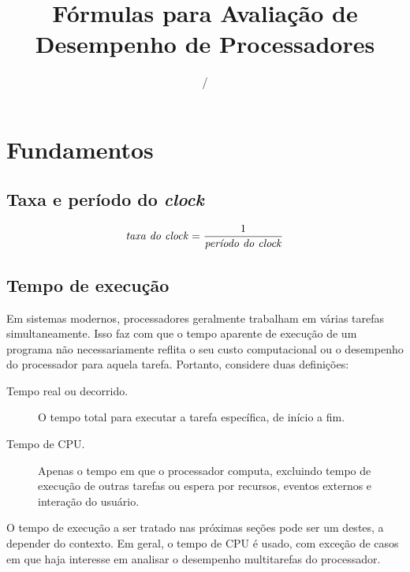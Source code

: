 \documentclass[12pt]{article}
\title{Fórmulas para Avaliação de Desempenho de Processadores}
\author{}
\date{\the\month/\the\year}
\newcommand{\Text}[1]{\textrm{\textit{#1}}}
\begin{document}
\maketitle

\tableofcontents

\vspace*{\fill}

\doclicenseThis

\newpage


\section{Fundamentos}


\subsection{Taxa e período do \textit{clock}}

\[ \Text{taxa do clock} = \frac{1}{\Text{período do clock}} \]


\subsection{Tempo de execução}

Em sistemas modernos, processadores geralmente trabalham em várias tarefas simultaneamente. Isso faz com que o tempo aparente de execução de um programa não necessariamente reflita o seu custo computacional ou o desempenho do processador para aquela tarefa. Portanto, considere duas definições:

\begin{description}
  \item[Tempo real ou decorrido.] O tempo total para executar a tarefa específica, de início a fim.
  \item[Tempo de CPU.] Apenas o tempo em que o processador computa, excluindo tempo de execução de outras tarefas ou espera por recursos, eventos externos e interação do usuário.
\end{description}

O tempo de execução a ser tratado nas próximas seções pode ser um destes, a depender do contexto. Em geral, o tempo de CPU é usado, com exceção de casos em que haja interesse em analisar o desempenho multitarefas do processador.


%
\end{document}
